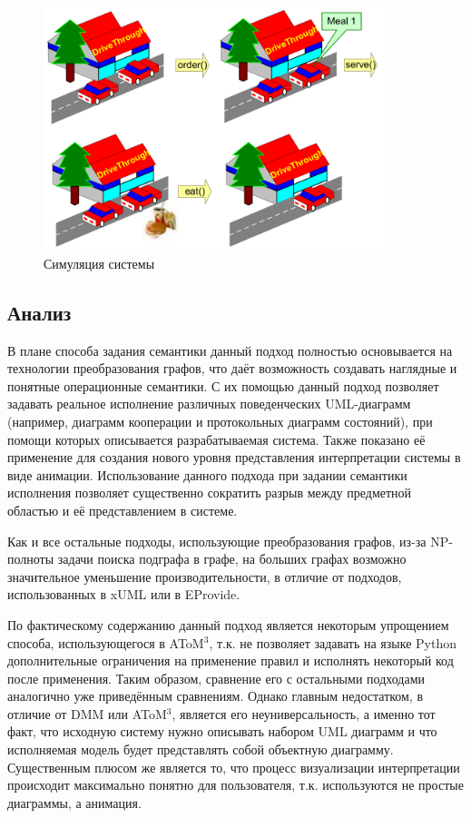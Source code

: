\documentclass[a5paper]{article}
\begin{document}
\begin{figure} [ht]
  \begin{center}
    \includegraphics[width=0.9\textwidth]{8.png}
    \caption{Симуляция системы}
    \label{fig8}
  \end{center}
\end{figure}

\subsection{Анализ}

В плане способа задания семантики данный подход полностью основывается на технологии преобразования графов, что даёт возможность создавать наглядные и понятные операционные семантики. С их помощью данный подход позволяет задавать реальное исполнение различных поведенческих UML-диаграмм (например, диаграмм кооперации и протокольных диаграмм состояний), при помощи которых описывается разрабатываемая система. Также показано её применение для создания нового уровня представления интерпретации системы в виде анимации. Использование данного подхода при задании семантики исполнения позволяет существенно сократить разрыв между предметной областью и её представлением в системе.

Как и все остальные подходы, использующие преобразования графов, из-за NP-полноты задачи поиска подграфа в графе, на больших графах возможно значительное уменьшение производительности, в отличие от подходов, использованных в xUML или в EProvide.

По фактическому содержанию данный подход является некоторым упрощением способа, использующегося в AToM$^3$, т.к. не позволяет задавать на языке Python дополнительные ограничения на применение правил и исполнять некоторый код после применения. Таким образом, сравнение его с остальными подходами аналогично уже приведённым сравнениям. Однако главным недостатком, в отличие от DMM или AToM$^3$, является его неуниверсальность, а именно тот факт, что исходную систему нужно описывать набором UML диаграмм и что исполняемая модель будет представлять собой объектную диаграмму. Существенным плюсом же является то, что процесс визуализации интерпретации происходит максимально понятно для пользователя, т.к. используются не простые диаграммы, а анимация.
\end{document}
